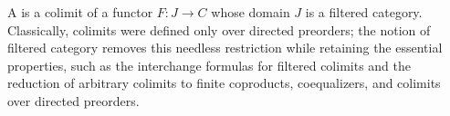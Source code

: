 A  is a colimit of a functor $F : J \to C$ whose domain $J$ is a filtered category. Classically, colimits were defined only over directed preorders; the notion of filtered category removes this needless restriction while retaining the essential properties, such as the interchange formulas for filtered colimits and the reduction of arbitrary colimits to finite coproducts, coequalizers, and colimits over directed preorders.
